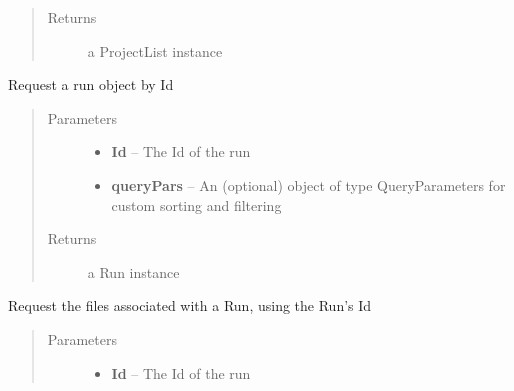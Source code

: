 \documentclass[letterpaper,10pt,english]{sphinxmanual}
\begin{document}
\begin{fulllineitems}
\begin{fulllineitems}
\begin{quote}
\begin{description}
\begin{itemize}
\end{itemize}

\item[{Returns}] \leavevmode
a ProjectList instance

\end{description}\end{quote}

\end{fulllineitems}


\begin{fulllineitems}
\label{Available modules:BaseSpacePy.api.BaseSpaceAPI.BaseSpaceAPI.getRunById}
Request a run object by Id
\begin{quote}\begin{description}
\item[{Parameters}] \leavevmode\begin{itemize}
\item {} 
\textbf{Id} -- The Id of the run

\item {} 
\textbf{queryPars} -- An (optional) object of type QueryParameters for custom sorting and filtering

\end{itemize}

\item[{Returns}] \leavevmode
a Run instance

\end{description}\end{quote}

\end{fulllineitems}


\begin{fulllineitems}
\label{Available modules:BaseSpacePy.api.BaseSpaceAPI.BaseSpaceAPI.getRunFilesById}
Request the files associated with a Run, using the Run's Id
\begin{quote}\begin{description}
\item[{Parameters}] \leavevmode\begin{itemize}
\item {} 
\textbf{Id} -- The Id of the run


\end{itemize}
\end{description}
\end{quote}
\end{fulllineitems}
\end{fulllineitems}
\end{document}
